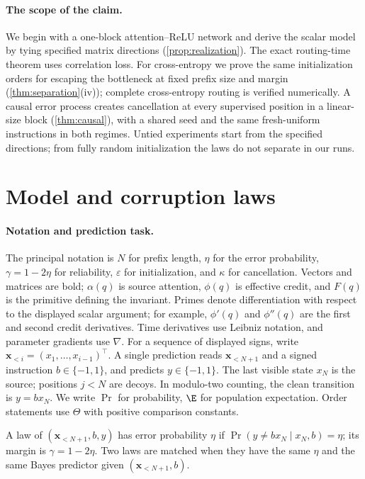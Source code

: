 \paragraph{The scope of the claim.} We begin with a one-block attention--ReLU network and derive the scalar model by tying specified matrix directions (\cref{prop:realization}). The exact routing-time theorem uses correlation loss. For cross-entropy we prove the same initialization orders for escaping the bottleneck at fixed prefix size and margin (\cref{thm:separation}(iv)); complete cross-entropy routing is verified numerically. A causal error process creates cancellation at every supervised position in a linear-size block (\cref{thm:causal}), with a shared seed and the same fresh-uniform instructions in both regimes. Untied experiments start from the specified directions; from fully random initialization the laws do not separate in our runs.

\section{Model and corruption laws}
\label{sec:setup}
\paragraph{Notation and prediction task.}
The principal notation is $N$ for prefix length, $\eta$ for the error probability,
$\gamma=1-2\eta$ for reliability, $\varepsilon$ for initialization, and $\kappa$ for cancellation.
Vectors and matrices are bold; $\alpha(q)$ is source attention, $\phi(q)$ is effective credit,
and $F(q)$ is the primitive defining the invariant.
Primes denote differentiation with respect to the displayed scalar argument;
for example, $\phi'(q)$ and $\phi''(q)$ are the first and second credit derivatives.
Time derivatives use Leibniz notation, and parameter gradients use $\nabla$.
For a sequence of displayed signs, write $\bm x_{<i}=(x_1,\ldots,x_{i-1})^\top$.
A single prediction reads $\bm x_{<N+1}$ and a signed instruction $b\in\{-1,1\}$, and predicts $y\in\{-1,1\}$.
The last visible state $x_N$ is the source; positions $j<N$ are decoys.
In modulo-two counting, the clean transition is $y=b x_N$.
We write $\Pr$ for probability, $\E$ for population expectation.
Order statements use $\Theta$ with positive comparison constants.

\begin{definition}
\label{def:law}
A law of $(\bm x_{<N+1},b,y)$ has error probability $\eta$ if
$\Pr(y\ne b x_N\mid x_N,b)=\eta$; its margin is $\gamma=1-2\eta$.
Two laws are matched when they have the same $\eta$ and the same Bayes predictor given $(\bm x_{<N+1},b)$.
\end{definition}

